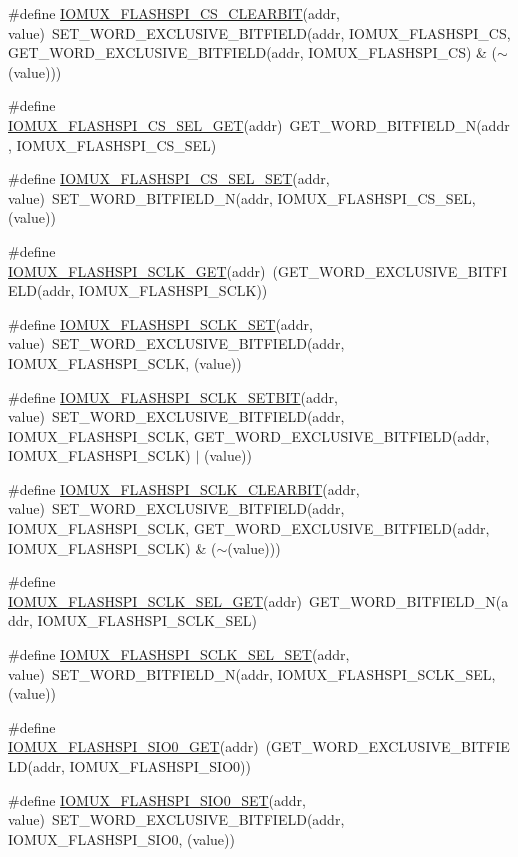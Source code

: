 \begin{DoxyCompactItemize}
\item 
\#define \hyperlink{a00559_a1b0e3403685c1fd3c47d08e356211964}{IOMUX\_\-FLASHSPI\_\-CS\_\-CLEARBIT}(addr, value)~SET\_\-WORD\_\-EXCLUSIVE\_\-BITFIELD(addr, IOMUX\_\-FLASHSPI\_\-CS, GET\_\-WORD\_\-EXCLUSIVE\_\-BITFIELD(addr, IOMUX\_\-FLASHSPI\_\-CS) \& ($\sim$(value)))
\item 
\#define \hyperlink{a00559_a418a33f8a347d9013e2e38a4fa56606f}{IOMUX\_\-FLASHSPI\_\-CS\_\-SEL\_\-GET}(addr)~GET\_\-WORD\_\-BITFIELD\_\-N(addr, IOMUX\_\-FLASHSPI\_\-CS\_\-SEL)
\item 
\#define \hyperlink{a00559_ad4e010305669f3312acf2bc9580948a8}{IOMUX\_\-FLASHSPI\_\-CS\_\-SEL\_\-SET}(addr, value)~SET\_\-WORD\_\-BITFIELD\_\-N(addr, IOMUX\_\-FLASHSPI\_\-CS\_\-SEL, (value))
\item 
\#define \hyperlink{a00559_ac46c004061df538d469db402a8d59948}{IOMUX\_\-FLASHSPI\_\-SCLK\_\-GET}(addr)~(GET\_\-WORD\_\-EXCLUSIVE\_\-BITFIELD(addr, IOMUX\_\-FLASHSPI\_\-SCLK))
\item 
\#define \hyperlink{a00559_a8280680037451a50676c7a7508227b93}{IOMUX\_\-FLASHSPI\_\-SCLK\_\-SET}(addr, value)~SET\_\-WORD\_\-EXCLUSIVE\_\-BITFIELD(addr, IOMUX\_\-FLASHSPI\_\-SCLK, (value))
\item 
\#define \hyperlink{a00559_af6e66f18458e6741832b35e35ab2110b}{IOMUX\_\-FLASHSPI\_\-SCLK\_\-SETBIT}(addr, value)~SET\_\-WORD\_\-EXCLUSIVE\_\-BITFIELD(addr, IOMUX\_\-FLASHSPI\_\-SCLK, GET\_\-WORD\_\-EXCLUSIVE\_\-BITFIELD(addr, IOMUX\_\-FLASHSPI\_\-SCLK) $|$ (value))
\item 
\#define \hyperlink{a00559_aa49038cbe5d1d56204beec1fd99ed824}{IOMUX\_\-FLASHSPI\_\-SCLK\_\-CLEARBIT}(addr, value)~SET\_\-WORD\_\-EXCLUSIVE\_\-BITFIELD(addr, IOMUX\_\-FLASHSPI\_\-SCLK, GET\_\-WORD\_\-EXCLUSIVE\_\-BITFIELD(addr, IOMUX\_\-FLASHSPI\_\-SCLK) \& ($\sim$(value)))
\item 
\#define \hyperlink{a00559_a4b47184871c5e131a66bdddc963e11ba}{IOMUX\_\-FLASHSPI\_\-SCLK\_\-SEL\_\-GET}(addr)~GET\_\-WORD\_\-BITFIELD\_\-N(addr, IOMUX\_\-FLASHSPI\_\-SCLK\_\-SEL)
\item 
\#define \hyperlink{a00559_a896a8364f06aae85eb4f6b884af8deb1}{IOMUX\_\-FLASHSPI\_\-SCLK\_\-SEL\_\-SET}(addr, value)~SET\_\-WORD\_\-BITFIELD\_\-N(addr, IOMUX\_\-FLASHSPI\_\-SCLK\_\-SEL, (value))
\item 
\#define \hyperlink{a00559_aa0b320ba2dbad91556f2d0b0651b9538}{IOMUX\_\-FLASHSPI\_\-SIO0\_\-GET}(addr)~(GET\_\-WORD\_\-EXCLUSIVE\_\-BITFIELD(addr, IOMUX\_\-FLASHSPI\_\-SIO0))
\item 
\#define \hyperlink{a00559_a2925b57d98c642bf7cd6bd5c25f32620}{IOMUX\_\-FLASHSPI\_\-SIO0\_\-SET}(addr, value)~SET\_\-WORD\_\-EXCLUSIVE\_\-BITFIELD(addr, IOMUX\_\-FLASHSPI\_\-SIO0, (value))

\end{DoxyCompactItemize}
